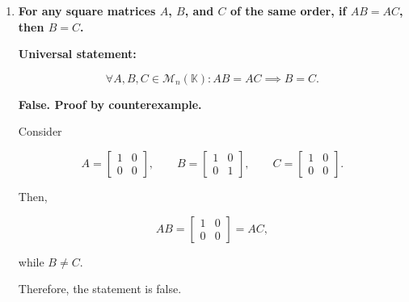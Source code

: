 \begin{enumerate}[label=\alph*)]
\begin{answer}
    \par\smallskip
    \noindent\textit{Case 2: $B$ is invertible.}

    Multiplying by $B^{-1}$ on the right:

    $$
    \begin{aligned}
        AB=0_n
        &\implies (AB)B^{-1}=0_nB^{-1} \\
        &\implies A(BB^{-1})=0_n \\
        &\implies AI_n=0_n \\
        &\implies \boxed{A=0_n}.
    \end{aligned}
    $$

    Hence, if at least one factor is
    invertible, the other must be zero
    whenever $AB=0_n$.
\end{answer}


\item {\bfseries\boldmath
    For any square matrices $A$, $B$,
    and $C$ of the same order, if $AB=AC$,
    then $B=C$.
}

\begin{answer}
    \textbf{Universal statement:}

    $$
    \forall A,B,C\in\mathcal{M}_n(\mathbb{K}):
    AB=AC\implies B=C.
    $$

    \textbf{False. Proof by counterexample.}

    Consider

    $$
    A=\begin{bmatrix}
        1 & 0 \\
        0 & 0
    \end{bmatrix},
    \qquad
    B=\begin{bmatrix}
        1 & 0 \\
        0 & 1
    \end{bmatrix},
    \qquad
    C=\begin{bmatrix}
        1 & 0 \\
        0 & 0
    \end{bmatrix}.
    $$

    Then,

    $$
    AB=\begin{bmatrix}
        1 & 0 \\
        0 & 0
    \end{bmatrix}
    =AC,
    $$

    while $B\neq C$.

    Therefore, the statement is false.


\end{answer}
\end{enumerate}
